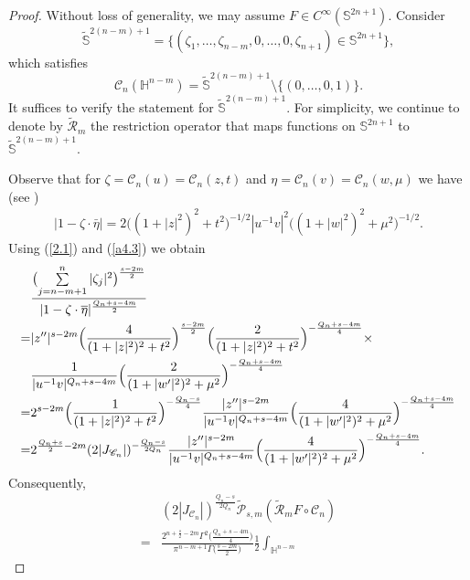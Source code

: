 \documentclass[12pt,reqno]{amsart}%
\theoremstyle{plain}
\numberwithin{equation}{section}
\begin{document}
\begin{proof}
Without loss of generality, we may assume \(F \in C^{\infty}(\mathbb{S}^{2n+1})\).
Consider
\[
\widetilde{\mathbb{S}}^{2(n-m)+1}
= \bigl\{(\zeta_{1},\dots,\zeta_{n-m},0,\dots,0,\zeta_{n+1})\in \mathbb{S}^{2n+1} \bigr\},
\]
which satisfies
\[
\mathscr{C}_{n}(\mathbb{H}^{n-m}) = \widetilde{\mathbb{S}}^{2(n-m)+1}\setminus\{(0,\dots,0,1)\}.
\]
It suffices to verify the statement for \(\widetilde{\mathbb{S}}^{2(n-m)+1}\).
For simplicity, we continue to denote by \(\widetilde{\mathcal{R}}_{m}\) the restriction operator that maps  functions  on \(\mathbb{S}^{2n+1}\) to \(\widetilde{\mathbb{S}}^{2(n-m)+1}\).

Observe that for \(\zeta = \mathscr{C}_{n}(u) = \mathscr{C}_{n}(z,t)\) and \(\eta = \mathscr{C}_{n}(v) = \mathscr{C}_{n}(w,\mu)\) we have (see \cite{fl2})
\begin{align}\label{a4.3}
|1-\zeta \cdot \bar{\eta}|
= 2\bigl((1+|z|^2)^2 + t^2\bigr)^{-1/2}
|u^{-1}v|^2
\bigl((1+|w|^2)^2 + \mu^2\bigr)^{-1/2}.
\end{align}
Using (\ref{2.1}) and (\ref{a4.3}) we obtain
\begin{align}\nonumber
&\frac{\bigl(\sum\limits_{j=n-m+1}^{n}|\zeta_{j}|^{2}\bigr)^{\frac{s-2m}{2}}}
{|1-\zeta\cdot\overline{\eta}|^{\frac{Q_n+s-4m}{2}}}\\
\nonumber
=& |z''|^{s-2m}
\Bigl(\frac{4}{(1+|z|^{2})^{2}+t^2}\Bigr)^{\frac{s-2m}{2}}
\Bigl(\frac{2}{(1+|z|^{2})^{2}+t^2}\Bigr)^{-\frac{Q_n+s-4m}{4}}\times\\
\nonumber
&
\frac{1}{|u^{-1}v|^{Q_n+s-4m}}
\Bigl(\frac{2}{(1+|w'|^{2})^{2}+\mu^2}\Bigr)^{-\frac{Q_n+s-4m}{4}}\\
\nonumber
=& 2^{s-2m}
\Bigl(\frac{1}{(1+|z|^{2})^{2}+t^2}\Bigr)^{-\frac{Q_n-s}{4}}
\frac{|z''|^{s-2m}}{|u^{-1}v|^{Q_n+s-4m}}
\Bigl(\frac{4}{(1+|w'|^{2})^{2}+\mu^2}\Bigr)^{-\frac{Q_n+s-4m}{4}}\\
\label{b3.1}
=& 2^{\frac{Q_n+s}{2}-2m}
(2|J_{\mathscr{C}_n}|)^{-\frac{Q_n-s}{2Q_n}}
\frac{|z''|^{s-2m}}{|u^{-1}v|^{Q_n+s-4m}}
\Bigl(\frac{4}{(1+|w'|^{2})^{2}+\mu^2}\Bigr)^{-\frac{Q_n+s-4m}{4}}.
\end{align}
Consequently,
\begin{align}\nonumber
&(2|J_{\mathscr{C}_n}|)^{\frac{Q_n-s}{2Q_n}}
\widetilde{\mathcal{P}}_{s,m}(\widetilde{\mathcal{R}}_{m}F\circ\mathscr{C}_{n})\\
\nonumber
=& \frac{2^{n+\frac{s}{2}-2m}\Gamma^{2}\bigl(\frac{Q_n+s-4m}{4}\bigr)}
{\pi^{n-m+1}\Gamma\bigl(\frac{s-2m}{2}\bigr)}
\frac{1}{2}\int_{\mathbb{H}^{n-m}}

\end{align}
\end{proof}
\end{document}
